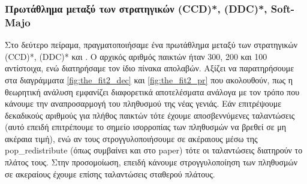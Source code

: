 \documentclass[a4paper,12pt]{article}
\begin{document}
\subsubsection*{Πρωτάθλημα μεταξύ των στρατηγικών \foreignlanguage{english}{(CCD)*, (DDC)*, Soft-Majo}}

Στο δεύτερο πείραμα, πραγματοποιήσαμε ένα πρωτάθλημα μεταξύ των στρατηγικών \foreignlanguage{english}{(CCD)*}, \foreignlanguage{english}{(DDC)*} και \foreignlanguage{english}{}. Ο αρχικός αριθμός παικτών ήταν 300, 200 και 100 αντίστοιχα, ενώ διατηρήσαμε τον ίδιο πίνακα απολαβών. Αξίζει να παρατηρήσουμε στα διαγράμματα \ref{fig:the_fit2_dec} και \ref{fig:the_fit2_pr} που ακολουθούν, πως η θεωρητική ανάλυση εμφανίζει διαφορετικά αποτελέσματα ανάλογα με τον τρόπο που κάνουμε την αναπροσαρμογή του πληθυσμού της νέας γενιάς. Εάν επιτρέψουμε δεκαδικούς αριθμούς για πλήθος παικτών τότε έχουμε αποσβεννύμενες ταλαντώσεις (αυτό επειδή επιτρέπουμε το σημείο ισορροπίας των πληθυσμών να βρεθεί σε μη ακέραια τιμή), ενώ αν τους στρογγυλοποιήσουμε σε ακέραιους μέσω της \foreignlanguage{english}{pop\_redistribute} (όπως συμβαίνει και στο \foreignlanguage{english}{paper}) τότε οι ταλαντώσεις διατηρούν το πλάτος τους. Στην προσομοίωση, επειδή κάνουμε στρογγυλοποίηση των πληθυσμών σε ακεραίους έχουμε επίσης ταλαντώσεις σταθερού πλάτους.
 
\end{document}
